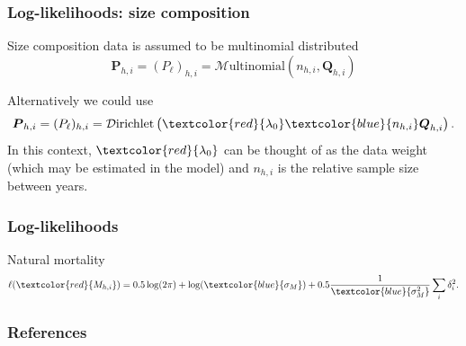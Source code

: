 \documentclass{beamer}
\begin{document}

\begin{frame}
\frametitle{Log-likelihoods: size composition}
Size composition data is assumed to be multinomial distributed
\begin{equation*}
  \boldsymbol{P}_{h,i} = (P_\ell)_{h,i} = \mathcal{M}\text{ultinomial} \left( n_{h,i},
  \boldsymbol{Q}_{h,i} \right)
\end{equation*}

Alternatively we could use
\begin{equation*}
  \boldsymbol{P}_{h,i} = (P_\ell)_{h,i} = \mathcal{D}\text{irichlet} \left(
    \textcolor{red}{\lambda_0} \textcolor{blue}{n_{h,i}} \boldsymbol{Q}_{h,i} \right).
\end{equation*}
In this context, $\textcolor{red}{\lambda_0}$ can be thought of as the data
weight (which may be estimated in the model) and $n_{h,i}$ is the relative
sample size between years.
\end{frame}


\begin{frame}
\frametitle{Log-likelihoods}
Natural mortality
\begin{equation*}
  \ell(\textcolor{red}{M_{h,i}}) = 
  0.5 \log (2 \pi) + \log (\textcolor{blue}{\sigma_{M}}) + 0.5
  \frac{1}{\textcolor{blue}{\sigma^2_{M}}} \sum_i
  \delta_i^2.
\end{equation*}
\end{frame}


\begin{frame}
\frametitle{References}


\end{frame}

\end{document}
